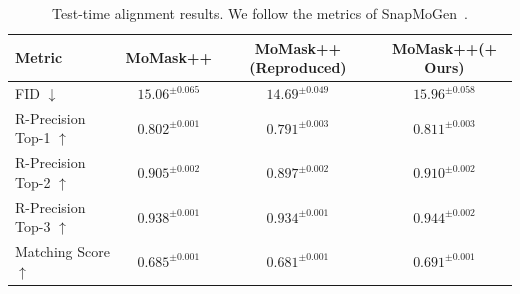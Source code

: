
    \begin{table}[t]
\centering
\caption{Test-time alignment results. We follow the metrics of SnapMoGen~\cite{guo2025snapmogen}.}
\label{tab:generation_results}
\begin{tabular}{lccc}
\toprule
Metric & \textbf{MoMask++} & \textbf{MoMask++(Reproduced)} & \textbf{MoMask++(+ Ours)} \\
\midrule
FID $\downarrow$             
& $15.06^{\pm 0.065}$ 
& $\mathbf{14.69}^{\pm 0.049}$  
& $15.96^{\pm 0.058}$ \\

\midrule

R-Precision Top-1 $\uparrow$  
& $0.802^{\pm 0.001}$ 
& $0.791^{\pm 0.003}$ 
& $\mathbf{0.811}^{\pm 0.003}$ \\

R-Precision Top-2 $\uparrow$  
& ${0.905}^{\pm 0.002}$ 
& $0.897^{\pm 0.002}$ 
& $\mathbf{0.910}^{\pm 0.002}$ \\

R-Precision Top-3 $\uparrow$  
& $0.938^{\pm 0.001}$ 
& $0.934^{\pm 0.001}$ 
& $\mathbf{0.944}^{\pm 0.002}$ \\

Matching Score $\uparrow$     
& $0.685^{\pm 0.001}$ 
& $0.681^{\pm 0.001}$ 
& $\mathbf{0.691}^{\pm 0.001}$ \\

\bottomrule
\end{tabular}
\vspace{5mm}
\end{table}